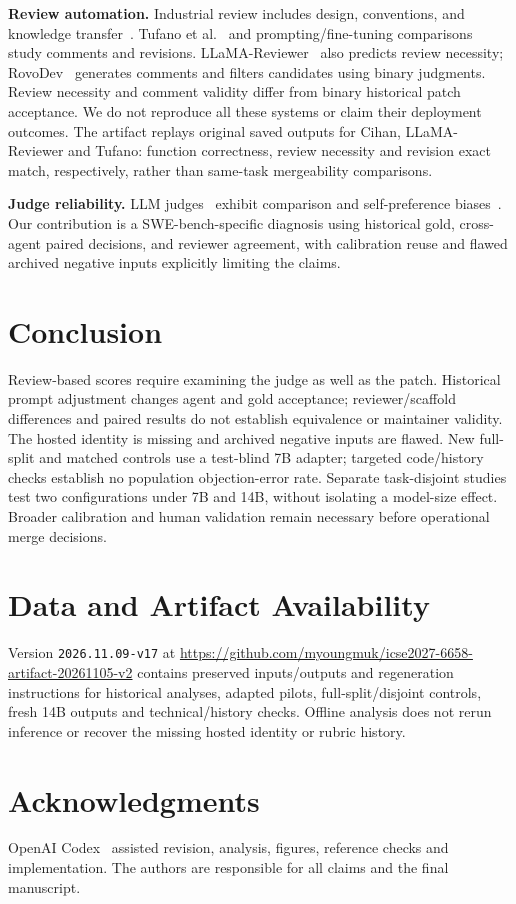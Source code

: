 \documentclass[10pt,conference]{IEEEtran}
\begin{document}
\textbf{Review automation.} Industrial review includes design, conventions, and knowledge
transfer~\cite{modernreview,bacchelli2013review,rigby2013convergent}.
Tufano et al.~\cite{tufanoreview} and prompting/fine-tuning
comparisons~\cite{promptreview} study comments and revisions. LLaMA-Reviewer~\cite{llamareviewer}
also predicts review necessity; RovoDev~\cite{rovodev} generates comments and filters
candidates using binary judgments. Review necessity and comment validity differ from
binary historical patch acceptance. We do not reproduce all these systems or claim
their deployment outcomes. The artifact replays original saved outputs for Cihan,
LLaMA-Reviewer and Tufano: function correctness, review necessity and revision exact
match, respectively, rather than same-task mergeability comparisons.

\textbf{Judge reliability.} LLM judges~\cite{llmjudge} exhibit comparison and self-preference
biases~\cite{wang2024fair,panickssery2024selfpref}. Our contribution is a SWE-bench-specific
diagnosis using historical gold, cross-agent paired decisions, and reviewer agreement,
with calibration reuse and flawed archived negative inputs explicitly limiting the claims.

\section{Conclusion}
Review-based scores require examining the judge as well as the patch. Historical prompt
adjustment changes agent and gold acceptance; reviewer/scaffold differences and paired
results do not establish equivalence or maintainer validity. The hosted identity is
missing and archived negative inputs are flawed. New full-split and matched controls
use a test-blind 7B adapter; targeted code/history checks establish no population
objection-error rate. Separate task-disjoint studies test two configurations under
7B and 14B, without isolating a model-size effect. Broader calibration and human validation remain necessary before
operational merge decisions.

\section*{Data and Artifact Availability}
Version \texttt{2026.11.09-v17} at
\url{https://github.com/myoungmuk/icse2027-6658-artifact-20261105-v2}
contains preserved inputs/outputs and regeneration instructions for historical analyses,
adapted pilots, full-split/disjoint controls, fresh 14B outputs and technical/history
checks. Offline analysis does not rerun inference or recover the missing hosted identity
or rubric history.

\section*{Acknowledgments}
OpenAI Codex~\cite{openaicodex} assisted revision, analysis, figures, reference checks and
implementation. The authors are responsible for all claims and the final manuscript.

\clearpage


\end{document}
